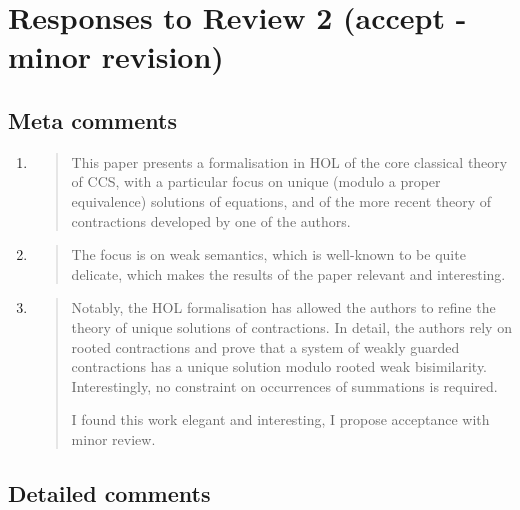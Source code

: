 \section*{Responses to Review 2 (accept - minor revision)}

\subsection*{Meta comments}

\begin{enumerate}
\item \begin{quote}
    This paper presents a formalisation in HOL of the core classical
    theory of CCS, with a particular focus on unique (modulo a proper
    equivalence) solutions of equations, and of the more recent theory
    of contractions developed by one of the authors.
  \end{quote}

\item \begin{quote}
    The focus is on weak semantics, which is well-known to be quite
    delicate, which makes the results of the paper relevant and
    interesting.
  \end{quote}

\item \begin{quote}
    Notably, the HOL formalisation has allowed the authors to refine
    the theory of unique solutions of contractions. In detail, the
    authors rely on rooted contractions and prove that a system of
    weakly guarded contractions has a unique solution modulo rooted
    weak bisimilarity. Interestingly, no constraint on occurrences of
    summations is required.

    I found this work elegant and interesting, I propose acceptance with minor review.
  \end{quote}

\end{enumerate}

\subsection*{Detailed comments}

